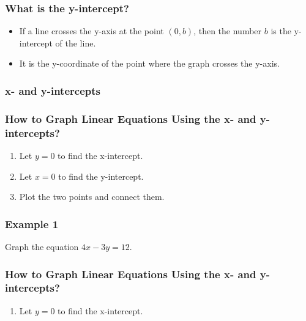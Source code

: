 \documentclass[14pt]{beamer}
\begin{document}
    \begin{frame}
    	\frametitle{What is the y-intercept?}
    	\begin{itemize}
    		\item If a line crosses the y-axis at the point $ (0,b) $, then the
    		number $ b $ is the y-intercept of the line. 
    		\item \pause It is the y-coordinate of the point where the graph crosses the y-axis.
    	\end{itemize}
    \end{frame}

    \begin{frame}
    	\frametitle{x- and y-intercepts}
    	
    	\pause {}
    	
    	\pause {}
    \end{frame}

    \begin{frame}
    	\frametitle{How to Graph Linear Equations Using the x- and y-intercepts?}
    	\begin{enumerate}  
    		\item Let $ y = 0 $ to find the x-intercept.
    		\item \pause Let $ x = 0 $ to find the y-intercept.
    		\item \pause Plot the two points and connect them.
    	\end{enumerate} 
    \end{frame} 

    \begin{frame}
    	\frametitle{Example 1}
    	Graph the equation $ 4x - 3y = 12 $.
    \end{frame} 

    \begin{frame}
    	\frametitle{How to Graph Linear Equations Using the x- and y-intercepts?}
    	\begin{enumerate}  
    		\item Let $ y = 0 $ to find the x-intercept.
    	\end{enumerate} 
    \end{frame} 
\end{document}

